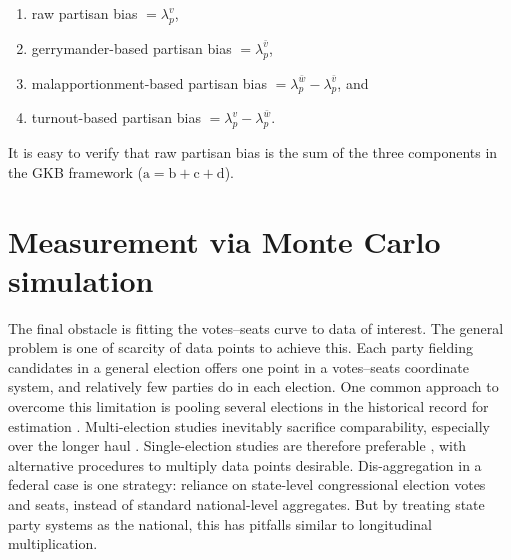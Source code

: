 \documentclass[letter,12pt]{article}
\begin{document}
\begin{enumerate}
\renewcommand{\theenumi}{\alph{enumi}}
\item raw partisan bias $=\lambda_p^v$,
\item gerrymander-based partisan bias $=\lambda_p^{\bar{v}}$, 
\item malapportionment-based partisan bias $=\lambda_p^{\bar{w}}-\lambda_p^{\bar{v}}$, and
\item turnout-based partisan bias $=\lambda_p^v-\lambda_p^{\bar{w}}$.
\end{enumerate}

\noindent It is easy to verify that raw partisan bias is the sum of the three components in the GKB framework ($\text{a}=\text{b}+\text{c}+\text{d}$). 

\section{Measurement via Monte Carlo simulation}

The final obstacle is fitting the votes--seats curve to data of interest. The general problem is one of scarcity of data points to achieve this. Each party fielding candidates in a general election offers one point in a votes--seats coordinate system, and relatively few parties do in each election. One common approach to overcome this limitation is pooling several elections in the historical record for estimation \citep[e.g.,][]{marquez2014biasBlog}. Multi-election studies inevitably sacrifice comparability, especially over the longer haul \citep{jackmanMeasuringBias1994}. Single-election studies are therefore preferable \citep{niemi.fett1986swing}, with alternative procedures to multiply data points desirable. Dis-aggregation in a federal case is one strategy: reliance on state-level congressional election votes and seats, instead of standard national-level aggregates. But by treating state party systems as the national, this has pitfalls similar to longitudinal multiplication. 
\end{document}
